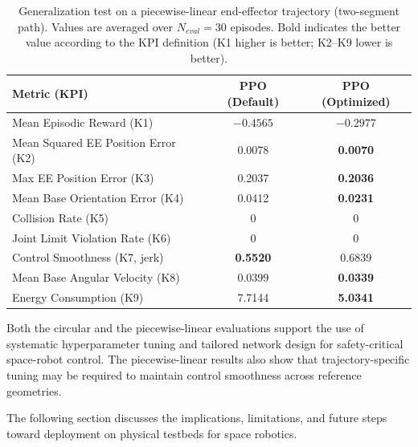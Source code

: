 \documentclass{ieeeaccess}
\begin{document}
\begin{table}[!b]
\centering
\caption{Generalization test on a piecewise-linear end-effector trajectory (two-segment path). Values are 
averaged over $N_{eval}=30$ episodes. Bold indicates the better value according to the KPI definition (K1 higher is better; K2--K9 lower is better).}
\label{tab:ppo_linear_kpi}
\renewcommand{\arraystretch}{1.2}
\setlength{\tabcolsep}{3pt}
\begin{tabular}{lcc}
\toprule
\textbf{Metric (KPI)} & \textbf{PPO (Default)} & \textbf{PPO (Optimized)} \\
\midrule
Mean Episodic Reward (K1)            & $-0.4565$ & $\mathbf{-0.2977}$ \\
Mean Squared EE Position Error (K2)  & 0.0078 & \textbf{0.0070} \\
Max EE Position Error (K3)           & 0.2037 & \textbf{0.2036} \\
Mean Base Orientation Error (K4)     & 0.0412 & \textbf{0.0231} \\
Collision Rate (K5)                 & 0 & 0 \\
Joint Limit Violation Rate (K6)     & 0 & 0 \\
Control Smoothness (K7, jerk)       & \textbf{0.5520} & 0.6839 \\
Mean Base Angular Velocity (K8)      & 0.0399 & \textbf{0.0339} \\
Energy Consumption (K9)              & 7.7144 & \textbf{5.0341} \\
\bottomrule
\end{tabular}
\end{table}


Both the circular and the piecewise-linear evaluations support the use of systematic hyperparameter tuning and tailored network design for safety-critical space-robot control. The piecewise-linear results also show that trajectory-specific tuning may be required to maintain control smoothness across reference geometries.

The following section discusses the implications, limitations, and future steps toward deployment on physical testbeds for space robotics.
\end{document}

